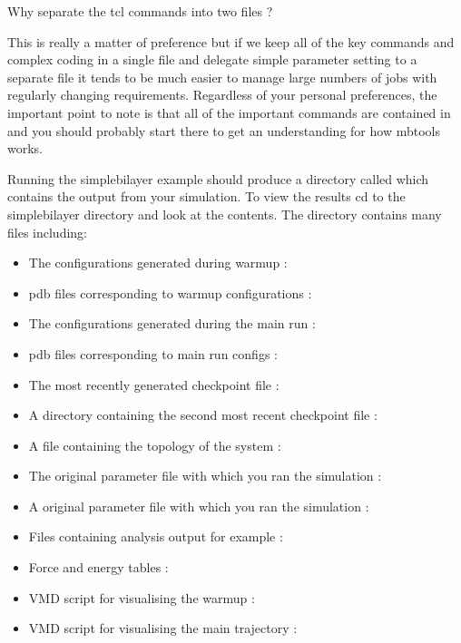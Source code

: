 Why separate the tcl commands into two files ?

This is really a matter of preference but if we keep all of the key commands and complex coding in a single file  and delegate simple parameter setting to a separate file it tends to be much easier to manage large numbers of jobs with regularly changing requirements. Regardless of your personal preferences, the important point to note is that all of the important commands are contained in  and you should probably start there to get an understanding for how mbtools works.

Running the simplebilayer example should produce a directory called  which contains the output from your simulation. To view the results cd to the simplebilayer directory and look at the contents. The directory contains many files including:

\begin{itemize}
  \item The configurations generated during warmup : 
  \item pdb files corresponding to warmup configurations : 
  \item The configurations generated during the main run : 
  \item pdb files corresponding to main run configs : 
  \item The most recently generated checkpoint file : 
  \item A directory containing the second most recent checkpoint file : 
  \item A file containing the topology of the system : 
  \item The original parameter file with which you ran the simulation : 
  \item A original parameter file with which you ran the simulation : 
  \item Files containing analysis output for example : 
  \item Force and energy tables : 
  \item VMD script for visualising the warmup : 
  \item VMD script for visualising the main trajectory : 
\end{itemize}

